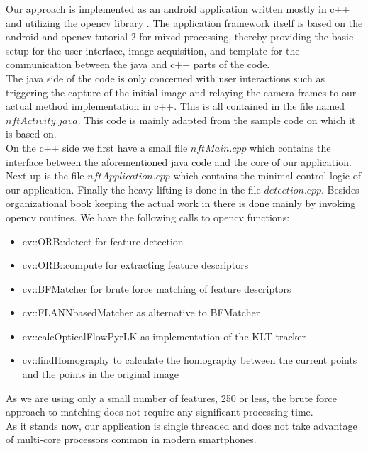 \documentclass[10pt,conference,compsocconf]{IEEEtran}
\begin{document}
Our approach is implemented as an android application written mostly in c++ and utilizing the opencv library \cite{web:ocvdocu}. The application framework itself is based on the android and opencv tutorial 2 for mixed processing, thereby providing the basic setup for the user interface, image acquisition, and template for the communication between the java and c++ parts of the code.
\\
\indent The java side of the code is only concerned with user interactions such as triggering the capture of the initial image and relaying the camera frames to our actual method implementation in c++. This is all contained in the file named $nftActivity.java$. This code is mainly adapted from the sample code on which it is based on.
\\ 
\indent On the c++ side we first have a small file $nftMain.cpp$ which contains the interface between the aforementioned java code and the core of our application. Next up is the file $nftApplication.cpp$ which contains the minimal control logic of our application. Finally the heavy lifting is done in the file $detection.cpp$. Besides organizational book keeping the actual work in there is done mainly by invoking opencv routines. We have the following calls to opencv functions:
\begin{itemize}
\item cv::ORB::detect for feature detection
\item cv::ORB::compute for extracting feature descriptors
\item cv::BFMatcher for brute force matching of feature descriptors
\item cv::FLANNbasedMatcher as alternative to BFMatcher
\item cv::calcOpticalFlowPyrLK as implementation of the KLT tracker
\item cv::findHomography to calculate the homography between the current points and the points in the original image
\end{itemize}
As we are using only a small number of features, 250 or less, the brute force approach to matching does not require any significant processing time. 
\\
\indent As it stands now, our application is single threaded and does not take advantage of multi-core processors common in modern smartphones.
\end{document}
